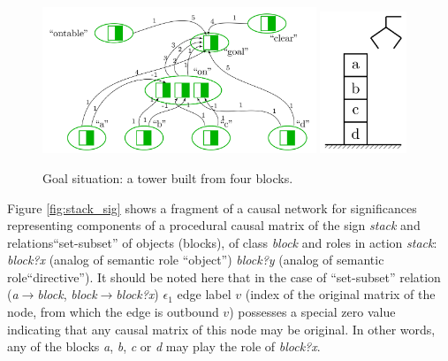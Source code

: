 \documentclass[review]{elsarticle}
\begin{document}
\begin{figure}
	\centering
	\includegraphics[width=0.73\textwidth]{plan_nets-0}
	\includegraphics[width=0.23\textwidth]{block_world-0}
	\caption{Goal situation: a tower built from four blocks.}	
	\label{fig:goal_sit}	
\end{figure}

Figure \ref{fig:stack_sig} shows a fragment of a causal network for significances representing components of a procedural causal matrix of the sign \textit{stack} and relations``set-subset'' of objects (blocks), of class \textit{block} and roles in action \textit{stack}: \textit{block?x} (analog of semantic role ``object'') \textit{block?y} (analog of semantic role``directive''). It should be noted here that in the case of ``set-subset'' relation (\textit{a}$\rightarrow$\textit{block}, \textit{block}$\rightarrow$\textit{block?x}) $\epsilon_1$ edge label $v$ (index of the original matrix of the node, from which the edge is outbound $v$) possesses a special zero value indicating that any causal matrix of this node may be original. In other words, any of the blocks \textit{a}, \textit{b}, \textit{c} or \textit{d} may play the role of \textit{block?x}.
\end{document}
